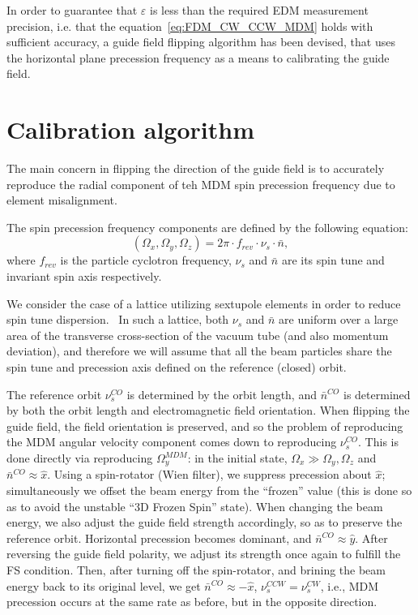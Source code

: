 \documentclass[a4paper]{jacow}
\newcommand{\W}{\Omega}
\begin{document}
In order to guarantee that $\varepsilon$ is less than the required EDM measurement precision, i.e. that the equation~\eqref{eq:FDM_CW_CCW_MDM} holds with sufficient accuracy, a guide field flipping algorithm has been devised, that uses the horizontal plane precession frequency as a means to calibrating the guide field. 

\section{Calibration algorithm}
The main concern in flipping the direction of the guide field is to accurately reproduce the radial component of teh MDM spin precession frequency due to element misalignment.

The spin precession frequency components are defined by the following equation:~\cite[p.~4]{COSY:SpinTuneMapping}
\[
(\W_x, \W_y, \W_z) = 2\pi\cdot f_{rev} \cdot \nu_s \cdot \bar n,
\]
where $f_{rev}$ is the particle cyclotron frequency, $\nu_s$ and $\bar n$ are its spin tune and invariant spin axis respectively.

We consider the case of a lattice utilizing sextupole elements in order to reduce spin tune dispersion.~\cite{Aksentev:DecohIPAC19} In such a lattice, both $\nu_s$ and $\bar n$ are uniform over a large area of the transverse cross-section of the vacuum tube (and also momentum deviation), and therefore we will assume that all the beam particles share the spin tune and precession axis defined on the reference (closed) orbit.

The reference orbit $\nu_s^{CO}$ is determined by the orbit length, and $\bar n^{CO}$ is determined by both the orbit length and electromagnetic field orientation. When flipping the guide field, the field orientation is preserved, and so the problem of reproducing the MDM angular velocity component comes down to reproducing $\nu_s^{CO}$. This is done directly via reproducing $\W_y^{MDM}$:
in the initial state, $\W_x\gg \W_y, \W_z$ and $\bar n^{CO}\approx \hat x$. Using a spin-rotator (Wien filter), we 
suppress precession about $\hat x$; simultaneously we offset the beam energy from the ``frozen'' value (this is done so as to avoid the unstable ``3D Frozen Spin'' state).  When changing the beam energy, we also adjust the guide field strength accordingly, so as to preserve the reference orbit. Horizontal precession becomes dominant, and $\bar n^{CO}\approx \hat y$. After reversing the guide field polarity, we adjust its strength once again to fulfill the FS condition. Then, after turning off the spin-rotator, and brining the beam energy back to its original level, we get $\bar n^{CO}\approx -\hat x$, $\nu_s^{CCW} = \nu_s^{CW}$, i.e., MDM precession occurs at the same rate as before, but in the opposite direction.
\end{document}
